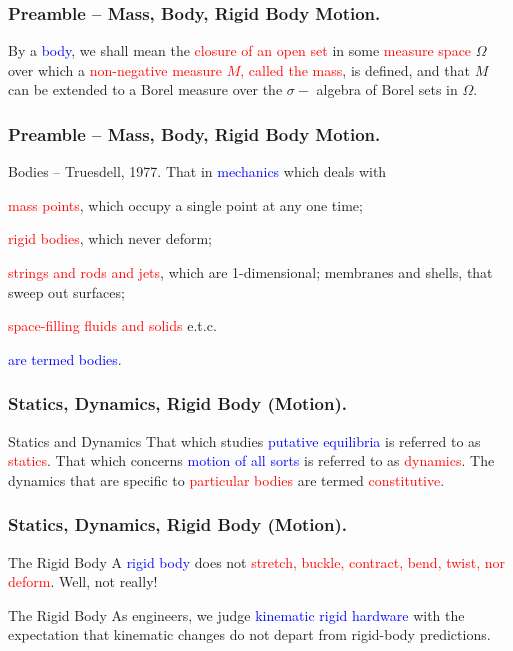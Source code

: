 \begin{frame}
	\frametitle{Preamble -- Mass, Body, Rigid Body Motion.}
	\begin{definition}
		By a \textcolor{blue}{body}, we shall mean the \textcolor{red}{closure of an open set} in some \textcolor{red}{measure space} $\Omega$ over which a \textcolor{red}{non-negative measure $M$, called the mass}, is defined, and that $M$ can be extended to a Borel measure over the $\sigma-$ algebra of Borel sets in $\Omega$.
	\end{definition}
\end{frame}

\begin{frame}
	\frametitle{Preamble -- Mass, Body, Rigid Body Motion.}
	\begin{block}{Bodies -- Truesdell, 1977.}
		That in \textcolor{blue}{mechanics} which deals with  \begin{inparaenum}[(i)]
			\item \textcolor{red}{mass points}, which occupy a single point at any one time;
			\item \textcolor{red}{rigid bodies}, which never deform;
			\item \textcolor{red}{strings and rods and jets}, which are 1-dimensional;  membranes and shells, that sweep out surfaces;
			\item \textcolor{red}{space-filling fluids and solids} e.t.c.
		\end{inparaenum}   
		\textcolor{blue}{are termed bodies}.
	\end{block}
\end{frame}


\begin{frame}
	\frametitle{Statics, Dynamics, Rigid Body (Motion).}
	\begin{block}{Statics and Dynamics}
		That which studies \textcolor{blue}{putative equilibria} is referred to as  \textcolor{red}{statics}. That which concerns  \textcolor{blue}{motion of all sorts} is referred to as  \textcolor{red}{dynamics}. The dynamics that are specific to  \textcolor{red}{particular bodies} are termed  \textcolor{red}{constitutive}.
	\end{block}
\end{frame}


\begin{frame}
	\frametitle{Statics, Dynamics, Rigid Body (Motion).}
	\begin{block}{The Rigid Body}
		A \textcolor{blue}{rigid body} does not \textcolor{red}{stretch, buckle, contract, bend, twist, nor deform}. Well, not really!
	\end{block}
	\begin{block}{The Rigid Body}
		As engineers, we judge  \textcolor{blue}{kinematic rigid hardware} with the expectation that kinematic changes do not depart from rigid-body predictions.
	\end{block}
\end{frame}

